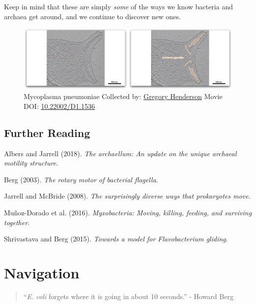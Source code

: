 \documentclass[]{tufte-book}
\begin{document}
Keep in mind that these are simply \emph{some} of the ways we know
bacteria and archaea get around, and we continue to discover new ones.





\begin{figure}
\includegraphics{movie_stills/6_12} \caption[Mycoplasma pneumoniae Collected by:
\protect\hyperlink{gregory_henderson}{Gregory Henderson} Movie DOI:
\href{https://doi.org/10.22002/D1.1536}{10.22002/D1.1536}]{Mycoplasma pneumoniae Collected by:
\protect\hyperlink{gregory_henderson}{Gregory Henderson} Movie DOI:
\href{https://doi.org/10.22002/D1.1536}{10.22002/D1.1536}}\label{fig:6-12}
\end{figure}

\section{Further Reading}\label{further-reading-5}

Albers and Jarrell (2018). \emph{The archaellum: An update on the unique
archaeal motility structure}.\citep{albers2018}

Berg (2003). \emph{The rotary motor of bacterial
flagella}.\citep{berg2003}

Jarrell and McBride (2008). \emph{The surprisingly diverse ways that
prokaryotes move}.\citep{jarrell2008}

Muñoz-Dorado et al. (2016). \emph{Myxobacteria: Moving, killing,
feeding, and surviving together}.\citep{munoz-dorado2016}

Shrivastava and Berg (2015). \emph{Towards a model for Flavobacterium
gliding}.\citep{shrivastava2015}

\chapter{Navigation}\label{navigation}

\begin{quote}
``\emph{E. coli} forgets where it is going in about 10 seconds.'' -
Howard Berg \citep{berg1988}
\end{quote}
\end{document}
